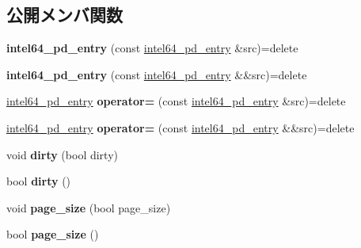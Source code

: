 \subsection*{公開メンバ関数}
\begin{DoxyCompactItemize}
\item 
\hypertarget{classintel64__pd__entry_a7e75916f391496e280a48a2e0975c256}{}{\bfseries intel64\+\_\+pd\+\_\+entry} (const \hyperlink{classintel64__pd__entry}{intel64\+\_\+pd\+\_\+entry} \&src)=delete\label{classintel64__pd__entry_a7e75916f391496e280a48a2e0975c256}

\item 
\hypertarget{classintel64__pd__entry_a8d283c7b74a47f7ea2b0401e62c9c1f5}{}{\bfseries intel64\+\_\+pd\+\_\+entry} (const \hyperlink{classintel64__pd__entry}{intel64\+\_\+pd\+\_\+entry} \&\&src)=delete\label{classintel64__pd__entry_a8d283c7b74a47f7ea2b0401e62c9c1f5}

\item 
\hypertarget{classintel64__pd__entry_ac43293f1913f7b0defc09fddc4d41c42}{}\hyperlink{classintel64__pd__entry}{intel64\+\_\+pd\+\_\+entry} {\bfseries operator=} (const \hyperlink{classintel64__pd__entry}{intel64\+\_\+pd\+\_\+entry} \&src)=delete\label{classintel64__pd__entry_ac43293f1913f7b0defc09fddc4d41c42}

\item 
\hypertarget{classintel64__pd__entry_a7c1b852616a6ae19011ba5ab8d3723ed}{}\hyperlink{classintel64__pd__entry}{intel64\+\_\+pd\+\_\+entry} {\bfseries operator=} (const \hyperlink{classintel64__pd__entry}{intel64\+\_\+pd\+\_\+entry} \&\&src)=delete\label{classintel64__pd__entry_a7c1b852616a6ae19011ba5ab8d3723ed}

\item 
\hypertarget{classintel64__pd__entry_afa5cd8baf3b1d7445d1f88da0b8a2211}{}void {\bfseries dirty} (bool dirty)\label{classintel64__pd__entry_afa5cd8baf3b1d7445d1f88da0b8a2211}

\item 
\hypertarget{classintel64__pd__entry_a1a1543ea38de92711606c51620c08558}{}bool {\bfseries dirty} ()\label{classintel64__pd__entry_a1a1543ea38de92711606c51620c08558}

\item 
\hypertarget{classintel64__pd__entry_afd12d3fb710982d226307c2001cbae69}{}void {\bfseries page\+\_\+size} (bool page\+\_\+size)\label{classintel64__pd__entry_afd12d3fb710982d226307c2001cbae69}

\item 
\hypertarget{classintel64__pd__entry_a749a18ca2604bf41456351f8dc9ee44c}{}bool {\bfseries page\+\_\+size} ()\label{classintel64__pd__entry_a749a18ca2604bf41456351f8dc9ee44c}


\end{DoxyCompactItemize}
